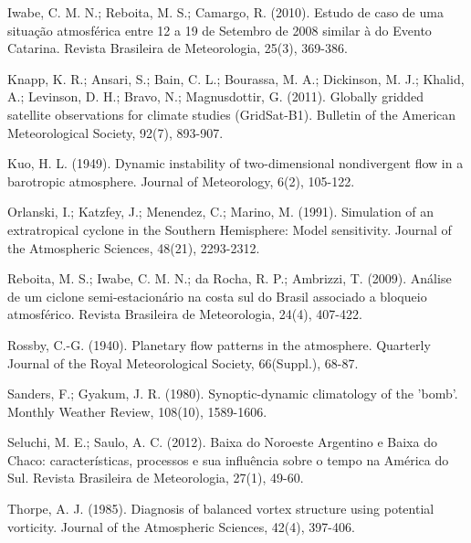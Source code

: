 \documentclass[twocolumn,a4paper,10pt]{article}
\begin{document}
\begin{description}
    \item Iwabe, C. M. N.; Reboita, M. S.; Camargo, R. (2010). Estudo de caso de uma situa\c{c}\~ao atmosf\'erica entre 12 a 19 de Setembro de 2008 similar \`a do Evento Catarina. Revista Brasileira de Meteorologia, 25(3), 369-386.
    \item Knapp, K. R.; Ansari, S.; Bain, C. L.; Bourassa, M. A.; Dickinson, M. J.; Khalid, A.; Levinson, D. H.; Bravo, N.; Magnusdottir, G. (2011). Globally gridded satellite observations for climate studies (GridSat-B1). Bulletin of the American Meteorological Society, 92(7), 893-907.
    \item Kuo, H. L. (1949). Dynamic instability of two-dimensional nondivergent flow in a barotropic atmosphere. Journal of Meteorology, 6(2), 105-122.
    \item Orlanski, I.; Katzfey, J.; Menendez, C.; Marino, M. (1991). Simulation of an extratropical cyclone in the Southern Hemisphere: Model sensitivity. Journal of the Atmospheric Sciences, 48(21), 2293-2312.
    \item Reboita, M. S.; Iwabe, C. M. N.; da Rocha, R. P.; Ambrizzi, T. (2009). An\'alise de um ciclone semi-estacion\'ario na costa sul do Brasil associado a bloqueio atmosf\'erico. Revista Brasileira de Meteorologia, 24(4), 407-422.
    \item Rossby, C.-G. (1940). Planetary flow patterns in the atmosphere. Quarterly Journal of the Royal Meteorological Society, 66(Suppl.), 68-87.
    \item Sanders, F.; Gyakum, J. R. (1980). Synoptic-dynamic climatology of the 'bomb'. Monthly Weather Review, 108(10), 1589-1606.
    \item Seluchi, M. E.; Saulo, A. C. (2012). Baixa do Noroeste Argentino e Baixa do Chaco: caracter\'isticas, processos e sua influ\^encia sobre o tempo na Am\'erica do Sul. Revista Brasileira de Meteorologia, 27(1), 49-60.
    \item Thorpe, A. J. (1985). Diagnosis of balanced vortex structure using potential vorticity. Journal of the Atmospheric Sciences, 42(4), 397-406.
\end{description}
\end{document}
